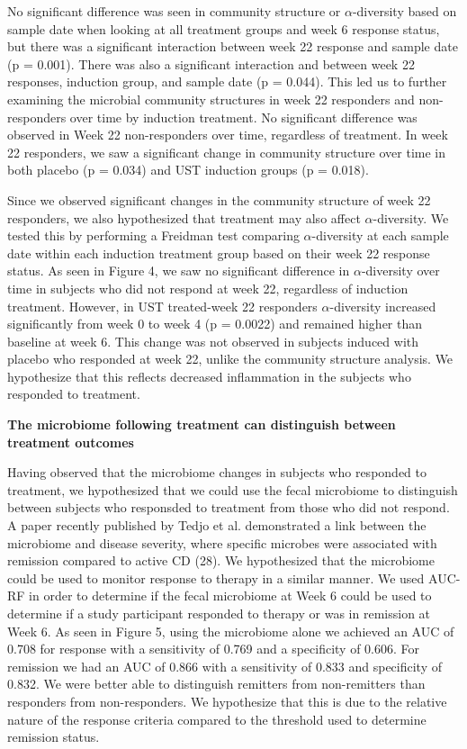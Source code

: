 \documentclass[11pt,]{article}
\begin{document}
No significant difference was seen in community structure or
\({\alpha}\)-diversity based on sample date when looking at all
treatment groups and week 6 response status, but there was a significant
interaction between week 22 response and sample date (p = 0.001). There
was also a significant interaction and between week 22 responses,
induction group, and sample date (p = 0.044). This led us to further
examining the microbial community structures in week 22 responders and
non-responders over time by induction treatment. No significant
difference was observed in Week 22 non-responders over time, regardless
of treatment. In week 22 responders, we saw a significant change in
community structure over time in both placebo (p = 0.034) and UST
induction groups (p = 0.018).

Since we observed significant changes in the community structure of week
22 responders, we also hypothesized that treatment may also affect
\({\alpha}\)-diversity. We tested this by performing a Freidman test
comparing \({\alpha}\)-diversity at each sample date within each
induction treatment group based on their week 22 response status. As
seen in Figure 4, we saw no significant difference in
\({\alpha}\)-diversity over time in subjects who did not respond at week
22, regardless of induction treatment. However, in UST treated-week 22
responders \({\alpha}\)-diversity increased significantly from week 0 to
week 4 (p = 0.0022) and remained higher than baseline at week 6. This
change was not observed in subjects induced with placebo who responded
at week 22, unlike the community structure analysis. We hypothesize that
this reflects decreased inflammation in the subjects who responded to
treatment.

\textbf{The microbiome following treatment can distinguish between
treatment outcomes}

Having observed that the microbiome changes in subjects who responded to
treatment, we hypothesized that we could use the fecal microbiome to
distinguish between subjects who responsded to treatment from those who
did not respond. A paper recently published by Tedjo et al. demonstrated
a link between the microbiome and disease severity, where specific
microbes were associated with remission compared to active CD (28). We
hypothesized that the microbiome could be used to monitor response to
therapy in a similar manner. We used AUC-RF in order to determine if the
fecal microbiome at Week 6 could be used to determine if a study
participant responded to therapy or was in remission at Week 6. As seen
in Figure 5, using the microbiome alone we achieved an AUC of 0.708 for
response with a sensitivity of 0.769 and a specificity of 0.606. For
remission we had an AUC of 0.866 with a sensitivity of 0.833 and
specificity of 0.832. We were better able to distinguish remitters from
non-remitters than responders from non-responders. We hypothesize that
this is due to the relative nature of the response criteria compared to
the threshold used to determine remission status.
\end{document}
